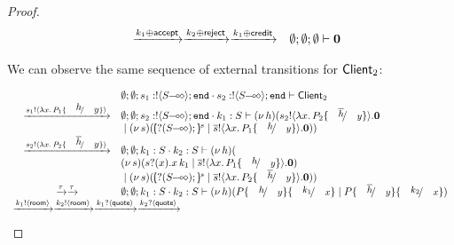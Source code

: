 \begin{proof}
\[\begin{array}{rcl}
		&\xrightarrow{k_1 \oplus \mathsf{accept}} \xrightarrow{k_2 \oplus \mathsf{reject}} \xrightarrow{k_1 \oplus \mathsf{credit}}&
		\emptyset; \emptyset; \emptyset \vdash \mathbf{0}
	\end{array}
\]

	We can observe the same sequence of external transitions for $\mathsf{Client}_2$:

\[
	\begin{array}{rcl}
		&& \es; \es; s_1: \btout{\lhot{S}} \tinact \cat s_2: \btout{\lhot{S}} \tinact \proves \Client_2
		\\

		&\by{\bactout{s_1}{\abs{x}{P_1 \subst{h}{y}}}}&
		\es; \es; s_2: \btout{\lhot{S}} \tinact \cat k_1: S \proves \newsp{h}{\bout{s_2}{\abs{x}{P_2 \subst{\dual{h}}{y}}} \inact\\
		&& \Par \newsp{s}{\mapchar{\btinp{\lhot{S}}}{s} \Par \bout{\dual{s}}{\abs{x}{P_1 \subst{h}{y}}} \inact }}
		\\

		&\by{\bactout{s_2}{\abs{x}{P_2 \subst{\dual{h}}{y}}}}&
		\es; \es; k_1: S \cat k_2: S \proves \newsp{h}{\\
		&& \newsp{s}{\binp{s}{x} \appl{x}{k_1} \Par \bout{\dual{s}}{\abs{x}{P_1 \subst{h}{y}}} \inact }\\
		&& \Par \newsp{s}{\mapchar{\btinp{\lhot{S}}}{s} \Par \bout{\dual{s}}{\abs{x}{P_2 \subst{\dual{h}}{y}}} \inact }}
		\\

		&\by{\tau}\by{\tau}&
		\es; \es; k_1: S \cat k_2: S \proves \newsp{h}{
		P\subst{h}{y} \subst{k_1}{x} \Par P\subst{\dual{h}}{y} \subst{k_2}{x}}
		\\

		\multicolumn{3}{l}{
		\by{\bactout{k_1}{\rtype}} \by{\bactout{k_2}{\rtype}} \by{\bactinp{k_1}{\Quote}} \by{\bactinp{k_2}{\Quote} }
		}
		\\


\end{array}\]
\end{proof}
